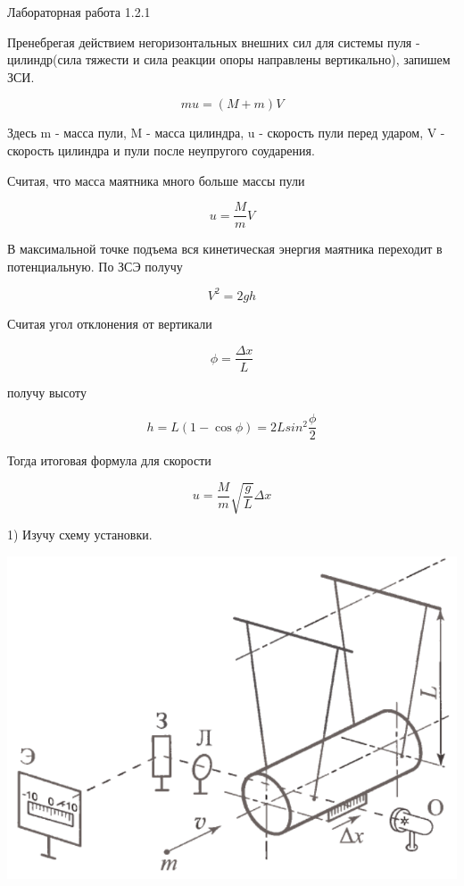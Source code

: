 \documentclass{astroedu-lab}
\begin{document}
\begin{problem}{\large Лабораторная работа 1.2.1}
\begin{center}
\label{fig:mpr}

\end{center}

Пренебрегая действием негоризонтальных внешних сил для системы пуля - цилиндр(сила тяжести и сила реакции опоры направлены вертикально), запишем ЗСИ.

\begin{equation}
	m u  = (M + m) V
\end{equation}

Здесь m - масса пули, M - масса цилиндра, u - скорость пули перед ударом, V - скорость цилиндра и пули после неупругого соударения.

Считая, что масса маятника много больше массы пули

\begin{equation}
	u  = \frac{M}{m} V
\end{equation}

В максимальной точке подъема вся кинетическая энергия маятника переходит в потенциальную. По ЗСЭ получу

\begin{equation}
	V^2 = 2 g h
\end{equation}

Считая угол отклонения от вертикали

\begin{equation}
	\phi = \frac{\Delta x}{L}
\end{equation}

получу высоту

\begin{equation}
	h = L (1 - \cos{\phi}) = 2 L sin^2 \frac{\phi}{2}
\end{equation}

Тогда итоговая формула для скорости


\[
\boxed{u = \frac{M}{m} \sqrt{\frac{g}{L}} \Delta x}
\]

\newpage

1) Изучу схему установки.

\begin{center}

\includegraphics[width=0.6\linewidth]{pic_1.png}


\end{center}
\end{problem}
\end{document}
